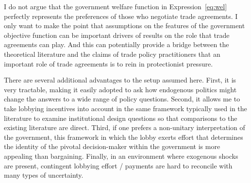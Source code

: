 \documentclass[12pt,titlepage]{article}
\newcommand{\ga}{\gamma}
\begin{document}
I do not argue that the government welfare function in Expression~\ref{eq:wel} perfectly represents the preferences of those who negotiate trade agreements. I only want to make the point that assumptions on the features of the government objective function can be important drivers of results on the role that trade agreements can play. And this can potentially provide a bridge between the theoretical literature and the claims of trade policy practitioners that an important role of trade agreements is to rein in protectionist pressure.

There are several additional advantages to the setup assumed here. First, it is very tractable, making it easily adopted to ask how endogenous politics might change the answers to a wide range of policy questions. Second, it allows me to take lobbying incentives into account in the same framework typically used in the literature to examine institutional design questions so that comparisons to the existing literature are direct. Third, if one prefers a non-unitary interpretation of the government, this framework in which the lobby exerts effort that determines the identity of the pivotal decision-maker within the government is more appealing than bargaining. Finally, in an environment where exogenous shocks are present, contingent lobbying effort / payments are hard to reconcile with many types of uncertainty. 

\end{document}
